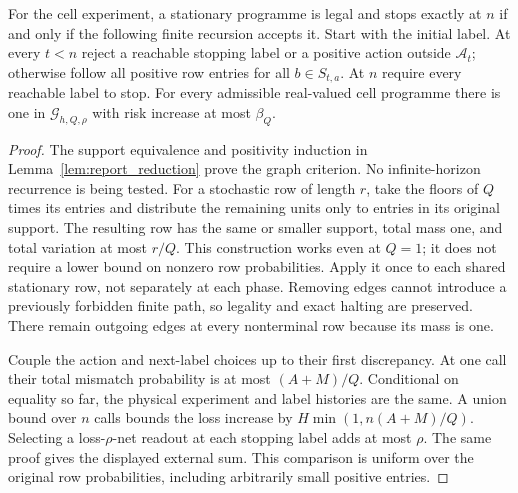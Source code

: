 \begin{lemma}\label{lem:dyadic_uniform}
For the cell experiment, a stationary programme is legal and stops exactly at $n$ if and only if the following finite recursion accepts it. Start with the initial label. At every $t<n$ reject a reachable stopping label or a positive action outside $\mathcal A_t$; otherwise follow all positive row entries for all $b\in S_{t,a}$. At $n$ require every reachable label to stop. For every admissible real-valued cell programme there is one in $\mathscr G_{h,Q,\rho}$ with risk increase at most $\beta_Q$.
\end{lemma}
\begin{proof}
The support equivalence and positivity induction in Lemma~\ref{lem:report_reduction} prove the graph criterion. No infinite-horizon recurrence is being tested. For a stochastic row of length $r$, take the floors of $Q$ times its entries and distribute the remaining units only to entries in its original support. The resulting row has the same or smaller support, total mass one, and total variation at most $r/Q$. This construction works even at $Q=1$; it does not require a lower bound on nonzero row probabilities. Apply it once to each shared stationary row, not separately at each phase. Removing edges cannot introduce a previously forbidden finite path, so legality and exact halting are preserved. There remain outgoing edges at every nonterminal row because its mass is one.

Couple the action and next-label choices up to their first discrepancy. At one call their total mismatch probability is at most $(A+M)/Q$. Conditional on equality so far, the physical experiment and label histories are the same. A union bound over $n$ calls bounds the loss increase by $H\min(1,n(A+M)/Q)$. Selecting a loss-$\rho$-net readout at each stopping label adds at most $\rho$. The same proof gives the displayed external sum. This comparison is uniform over the original row probabilities, including arbitrarily small positive entries.
\end{proof}

